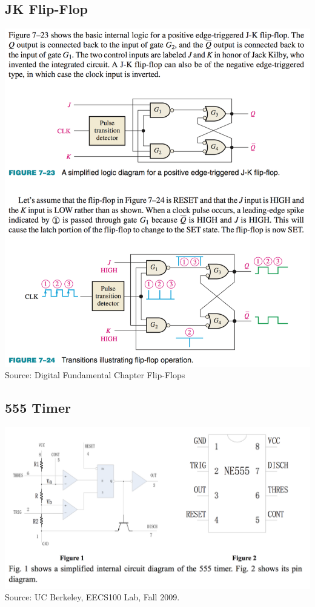\documentclass[12pt]{article}
\begin{document}
\subsection{JK Flip-Flop}
\includegraphics[scale=0.7]{JK.png}\\
Source: Digital Fundamental Chapter 
Flip-Flops

\subsection{555 Timer}
\includegraphics[scale=0.7]{555.png}\\
Source: UC Berkeley, EECS100 Lab, Fall 
2009.
\end{document}
